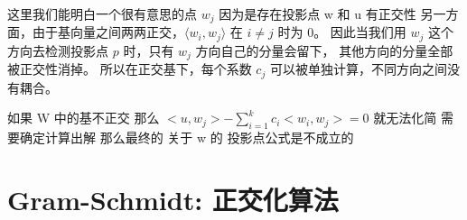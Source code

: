 \documentclass[12pt]{article}
\begin{document}
\begin{flushleft}
\begin{itemize}
        这里我们能明白一个很有意思的点 ${w_{j}}$ 因为是存在投影点 w  和 u 有正交性
        另一方面，由于基向量之间两两正交，\(\langle w_i,w_j\rangle\) 在 \(i\neq j\) 时为 0。
        因此当我们用 \(w_j\) 这个方向去检测投影点 \(p\) 时，只有 \(w_j\) 方向自己的分量会留下，
        其他方向的分量全部被正交性消掉。
        所以在正交基下，每个系数 \(c_j\) 可以被单独计算，不同方向之间没有耦合。

        如果 W 中的基不正交 那么 $<u,w_{j}> - \sum_{i=1}^{k}c_{i}<w_{i},w_{j}> = 0$ 就无法化简 需要确定计算出解
        那么最终的 关于 w 的 投影点公式是不成立的

    \end{itemize}
\end{flushleft}


\section{Gram-Schmidt: 正交化算法}
\end{document}

